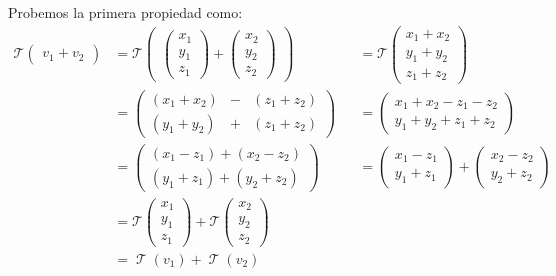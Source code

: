 \documentclass[12pt, fleqn]{report}                             %
\theoremstyle{break}                                            %
\DeclareMathOperator \LinTrans {\mathcal{T}}                    %
\newcommand{\VecLinTrans}[1]{\mathcal{T}\pVector{#1}}           %
\newcommand{\pVector}[1]                                        %
        { \ensuremath{\begin{pmatrix}#1\end{pmatrix}} }             %
\begin{document}
                    Probemos la primera propiedad como:
                    \begin{align*}
                        \VecLinTrans{ v_1 + v_2 }                                             
                            &= \VecLinTrans{ \pVector{x_1\\y_1\\z_1} +\pVector{x_2\\y_2\\z_2} }
                                &&= \VecLinTrans{ x_1+x_2\\y_1+y_2\\z_1+z_2 }                               \\
                            &= \pVector{ (x_1+x_2) & - & (z_1+z_2) \\ (y_1+y_2) & + & (z_1+z_2) }                       
                                &&= \pVector{ x_1+x_2-z_1-z_2 \\ y_1+y_2+z_1+z_2 }                          \\
                            &= \pVector{ (x_1-z_1)+(x_2-z_2) \\ (y_1+z_1)+(y_2+z_2) }                                   
                                &&= \pVector{ x_1-z_1\\y_1+z_1 }  + \pVector{ x_2-z_2\\y_2+z_2 }            \\
                            &= \VecLinTrans{x_1\\y_1\\z_1} +\VecLinTrans{x_2\\y_2\\z_2}                     \\
                            &= \LinTrans(v_1) + \LinTrans(v_2)
                    \end{align*}
\end{document}
